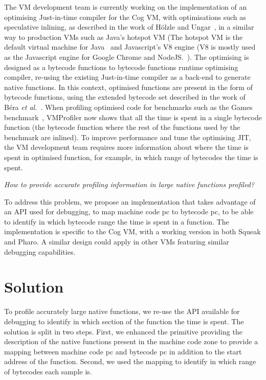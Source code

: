 \documentclass[10pt,preprint,nonatbib]{sigplanconf}
\newcommand{\etal}{\emph{et al.}\xspace}
\begin{document}
The VM development team is currently working on the implementation of an optimising Just-in-time compiler for the Cog VM, with optimisations such as speculative inlining, as described in the work of H\"olzle and Ungar~\cite{Holz94a}, in a similar way to production VMs such as Java's hotspot VM (The hotspot VM is the default virtual machine for Java~\cite{Pale01a} and Javascript's V8 engine (V8 is mostly used as the Javascript engine for Google Chrome and NodeJS.~\cite{V8}). The optimising is designed as a bytecode functions to bytecode functions runtime optimising compiler, re-using the existing Just-in-time compiler as a back-end to generate native functions. In this context, optimised functions are present in the form of bytecode functions, using the extended bytecode set described in the work of B\'era \etal~\cite{Bera14a}. When profiling optimised code for benchmarks such as the Games benchmark~\cite{GameBenchs}, VMProfiler now shows that all the time is spent in a single bytecode function (the bytecode function where the rest of the functions used by the benchmark are inlined). To improve performance and tune the optimising JIT, the VM development team requires more information about where the time is spent in optimised function, for example, in which range of bytecodes the time is spent.

\emph{How to provide accurate profiling information in large native functions profiled?}

To address this problem, we propose an implementation that takes advantage of an API used for debugging, to map machine code pc to bytecode pc, to be able to identify in which bytecode range the time is spent in a function. The implementation is specific to the Cog VM, with a working version in both Squeak and Pharo. A similar design could apply in other VMs featuring similar debugging capabilities.


\section{Solution}

To profile accurately large native functions, we re-use the API available for debugging to identify in which section of the function the time is spent. The solution is split in two steps. First, we enhanced the primitive providing the description of the native functions present in the machine code zone to provide a mapping between machine code pc and bytecode pc in addition to the start address of the function. Second, we used the mapping to identify in which range of bytecodes each sample is.
\end{document}
